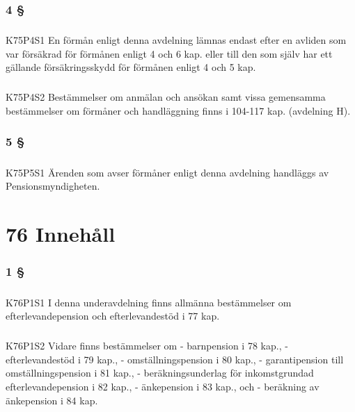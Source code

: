 \documentclass[a4paper,notitlepage,openany,10pt]{book}
\begin{document}
\subsection*{4 §}
\paragraph*{}
{\tiny K75P4S1}
En förmån enligt denna avdelning lämnas endast efter en avliden som var försäkrad för förmånen enligt 4 och 6 kap.
eller till den som själv har ett gällande försäkringsskydd för förmånen enligt 4 och 5 kap.
\paragraph*{}
{\tiny K75P4S2}
Bestämmelser om anmälan och ansökan samt vissa gemensamma bestämmelser om förmåner och handläggning finns i 104-117 kap. (avdelning H).
\subsection*{5 §}
\paragraph*{}
{\tiny K75P5S1}
Ärenden som avser förmåner enligt denna avdelning handläggs av Pensionsmyndigheten.
\chapter*{76 Innehåll}
\subsection*{1 §}
\paragraph*{}
{\tiny K76P1S1}
I denna underavdelning finns allmänna bestämmelser om efterlevandepension och efterlevandestöd i 77 kap.
\paragraph*{}
{\tiny K76P1S2}
Vidare finns bestämmelser om
\newline - barnpension i 78 kap.,
\newline - efterlevandestöd i 79 kap.,
\newline - omställningspension i 80 kap.,
\newline - garantipension till omställningspension i 81 kap.,
\newline - beräkningsunderlag för inkomstgrundad efterlevandepension i 82 kap.,
\newline - änkepension i 83 kap., och
\newline - beräkning av änkepension i 84 kap.
\end{document}
